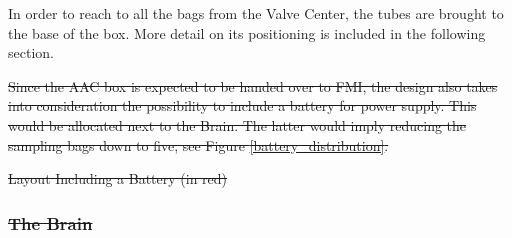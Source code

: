 \documentclass[a4paper,12pt,twoside]{article}
\providecommand{\DIFaddtex}[1]{{\protect\color{blue}\uwave{#1}}} %
\providecommand{\DIFdeltex}[1]{{\protect\color{red}\sout{#1}}}                      %
\providecommand{\DIFaddbegin}{} %
\providecommand{\DIFaddend}{} %
\providecommand{\DIFdelbegin}{} %
\providecommand{\DIFdelend}{} %
\providecommand{\DIFdelFL}[1]{\DIFdel{#1}} %
\providecommand{\DIFadd}[1]{\texorpdfstring{\DIFaddtex{#1}}{#1}} %
\providecommand{\DIFdel}[1]{\texorpdfstring{\DIFdeltex{#1}}{}} %
\newcommand{\DIFscaledelfig}{0.5}
\newlength{\DIFdelgraphicswidth} %
\newlength{\DIFdelgraphicsheight} %
\newcommand{\DIFaddincludegraphics}[2][]{{\color{blue}\fbox{\DIFOincludegraphics[#1]{#2}}}} %
\newcommand{\DIFdelincludegraphics}[2][]{%
\sbox{\DIFdelgraphicsbox}{\DIFOincludegraphics[#1]{#2}}%
\settoboxwidth{\DIFdelgraphicswidth}{\DIFdelgraphicsbox} %
\settoboxtotalheight{\DIFdelgraphicsheight}{\DIFdelgraphicsbox} %
\scalebox{\DIFscaledelfig}{%
\parbox[b]{\DIFdelgraphicswidth}{\usebox{\DIFdelgraphicsbox}\\[-\baselineskip] \rule{\DIFdelgraphicswidth}{0em}}\llap{\resizebox{\DIFdelgraphicswidth}{\DIFdelgraphicsheight}{%
\setlength{\unitlength}{\DIFdelgraphicswidth}%
\begin{picture}(1,1)%
\thicklines\linethickness{2pt} %
{\color[rgb]{1,0,0}\put(0,0){\framebox(1,1){}}}%
{\color[rgb]{1,0,0}\put(0,0){\line( 1,1){1}}}%
{\color[rgb]{1,0,0}\put(0,1){\line(1,-1){1}}}%
\end{picture}%
}\hspace*{3pt}}} %
} %
\DeclareRobustCommand{\DIFaddbegin}{\DIFOaddbegin \let\includegraphics\DIFaddincludegraphics} %
\DeclareRobustCommand{\DIFaddend}{\DIFOaddend \let\includegraphics\DIFOincludegraphics} %
\DeclareRobustCommand{\DIFdelbegin}{\DIFOdelbegin \let\includegraphics\DIFdelincludegraphics} %
\DeclareRobustCommand{\DIFdelend}{\DIFOaddend \let\includegraphics\DIFOincludegraphics} %
\begin{document}
\DIFaddbegin 

\DIFaddend In order to reach to all the bags from the Valve Center, the tubes are brought to the base of the box. More detail on its positioning is included in the following section. 

\DIFdelbegin %
\DIFdel{Since the AAC box is expected to be handed over to FMI, the design also takes into consideration the possibility to include a battery for power supply. This would be allocated next to the Brain. The latter would imply reducing the sampling bags down to five, see Figure \ref{battery_distribution}.
}%

\DIFdelend %

\DIFdelbegin %
{%
\DIFdelFL{Layout Including a Battery (in red)}}
\DIFdelend \DIFaddbegin \bigskip
\underline{\DIFadd{The Brain}}
\label{subsec:brain}
\DIFaddend 

\DIFdelbegin %
\subsubsection{\DIFdel{The Brain}}
\addtocounter{subsubsection}{-1}%
\end{document}
